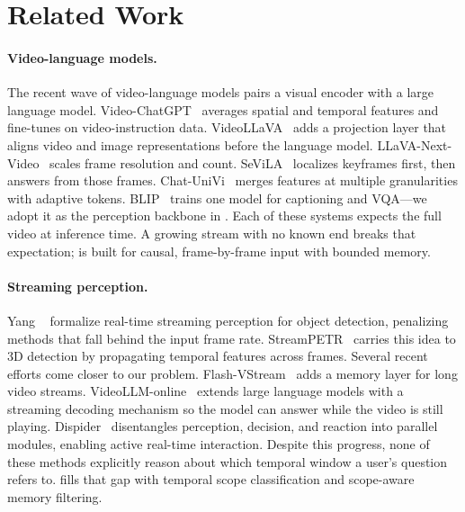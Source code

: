 \section{Related Work}
\label{sec:related}

\paragraph{Video-language models.}
The recent wave of video-language models pairs a visual encoder with a large language model.
Video-ChatGPT~\cite{maaz2023videochatgpt} averages spatial and temporal features and fine-tunes on video-instruction data.
VideoLLaVA~\cite{lin2023videollava} adds a projection layer that aligns video and image representations before the language model.
LLaVA-Next-Video~\cite{zhang2024llavanextvideo} scales frame resolution and count.
SeViLA~\cite{yu2023sevila} localizes keyframes first, then answers from those frames.
Chat-UniVi~\cite{jin2024chatunivi} merges features at multiple granularities with adaptive tokens.
BLIP~\cite{li2022blip} trains one model for captioning and VQA---we adopt it as the perception backbone in \ours.
Each of these systems expects the full video at inference time. A growing stream with no known end breaks that expectation; \ours is built for causal, frame-by-frame input with bounded memory.

\paragraph{Streaming perception.}
Yang \etal~\cite{yang2022real} formalize real-time streaming perception for object detection, penalizing methods that fall behind the input frame rate.
StreamPETR~\cite{wang2023streampetr} carries this idea to 3D detection by propagating temporal features across frames.
Several recent efforts come closer to our problem.
Flash-VStream~\cite{zhang2024flashvstream} adds a memory layer for long video streams.
VideoLLM-online~\cite{chen2024videollmonline} extends large language models with a streaming decoding mechanism so the model can answer while the video is still playing.
Dispider~\cite{he2024dispider} disentangles perception, decision, and reaction into parallel modules, enabling active real-time interaction.
Despite this progress, none of these methods explicitly reason about which temporal window a user's question refers to. \ours fills that gap with temporal scope classification and scope-aware memory filtering.

